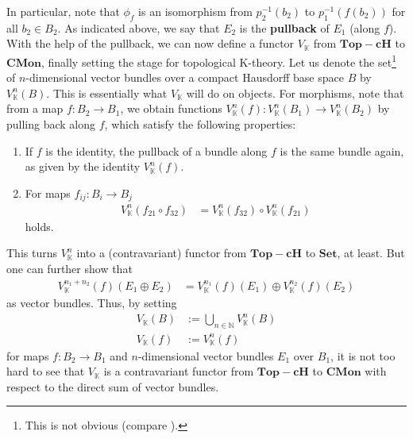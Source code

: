 In particular, note that $\phi_{f}$ is an isomorphism from $p_{2}^{-1}(b_{2})$ to $p_{1}^{-1}(f(b_{2}))$ for all $b_{2} \in B_{2}$.
As indicated above, we say that $E_{2}$ is the \textbf{pullback} of $E_{1}$ (along $f$).
\\
With the help of the pullback, we can now define a functor $V_{\mathbb{K}}$ from $\mathbf{Top-cH}$ to $\mathbf{CMon}$, finally setting the stage for topological K-theory.
Let us denote the set\footnote{This is not obvious (compare \cite{7fc005ba}).} of $n$-dimensional vector bundles over a compact Hausdorff base space $B$ by $V_{\mathbb{K}}^{n}(B)$.
This is essentially what $V_{\mathbb{K}}$ will do on objects.
For morphisms, note that from a map $f \colon B_{2} \to B_{1}$, we obtain functions $V_{\mathbb{K}}^{n}(f) \colon V_{\mathbb{K}}^{n}(B_{1}) \to V_{\mathbb{K}}^{n}(B_{2})$ by pulling back along $f$, which satisfy the following properties:
\begin{enumerate}
\item[(F1)]
If $f$ is the identity, the pullback of a bundle along $f$ is the same bundle again, as given by the identity $V_{\mathbb{K}}^{n}(f)$.
\item[(F2$^{\prime}$)]
For maps $f_{ij} \colon B_{i} \to B_{j}$
\begin{align*}
  V_{\mathbb{K}}^{n}(f_{21} \circ f_{32})
  &=
  V_{\mathbb{K}}^{n}(f_{32})
  \circ
  V_{\mathbb{K}}^{n}(f_{21})
\end{align*}
holds.
\end{enumerate}
This turns $V_{\mathbb{K}}^{n}$ into a (contravariant) functor from $\mathbf{Top-cH}$ to $\mathbf{Set}$, at least.
But one can further show that
\begin{align*}
  V_{\mathbb{K}}^{n_{1}+n_{2}}(f)(E_{1} \oplus E_{2})
  &=
  V_{\mathbb{K}}^{n_{1}}(f)(E_{1})
  \oplus
  V_{\mathbb{K}}^{n_{2}}(f)(E_{2})
\end{align*}
as vector bundles.
Thus, by setting
\begin{align*}
  V_{\mathbb{K}}(B)
  &:=
  \bigcup_{n \in \mathbb{N}}
  V_{\mathbb{K}}^{n}(B)
  \\
  V_{\mathbb{K}}(f)
  &:=
  V_{\mathbb{K}}^{n}(f)
\end{align*}
for maps $f \colon B_{2} \to B_{1}$ and $n$-dimensional vector bundles $E_{1}$ over $B_{1}$, it is not too hard to see that $V_{\mathbb{K}}$ is a contravariant functor from $\mathbf{Top-cH}$ to $\mathbf{CMon}$ with respect to the direct sum of vector bundles.
